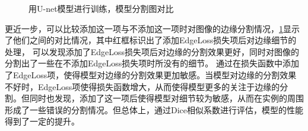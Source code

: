 \documentclass[AutoFakeBold]{LZUThesis}
\begin{document}
\begin{figure}[htbp]
    \centering
    \quad
    \quad
    \quad
    \centering
    \caption{用U-net模型进行训练，模型分割图对比}
    \label{mask_compare}
\end{figure}

更近一步，可以比较添加这一项与不添加这一项时对图像的边缘分割情况，\cref{mask_compare}显示了他们之间的对比情况，其中红框标识出了添加EdgeLoss损失项后对边缘细节的处理，
可以发现添加了EdgeLoss损失项后对边缘的分割效果更好，同时对图像的分割出了一些在不添加EdgeLoss损失项时所没有的细节。
通过在损失函数中添加了EdgeLoss项，使得模型对边缘的分割效果更加敏感。当模型对边缘的分割效果不好时，EdgeLoss项使得损失函数增大，从而使得模型更多的关注于边缘的分割。但同时也发现，添加了这一项后使得模型对细节较为敏感，从而在实例的周围形成了一些错误的分割情况。但总体上，通过Dice相似系数进行评估，模型的性能得到了一定的提升。
\end{document}
